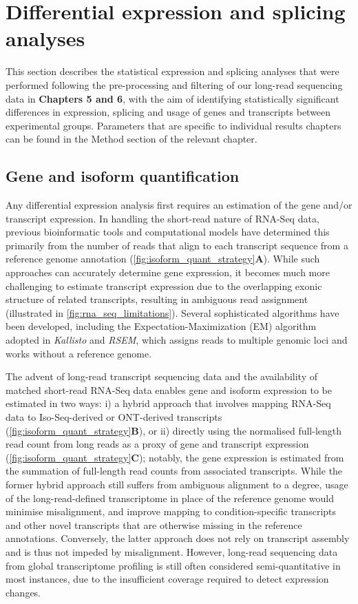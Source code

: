 \section{Differential expression and splicing analyses}

This section describes the statistical expression and splicing analyses that were performed following the pre-processing and filtering of our long-read sequencing data in \textbf{Chapters 5 and 6}, with the aim of identifying statistically significant differences in expression, splicing and usage of genes and transcripts between experimental groups. Parameters that are specific to individual results chapters can be found in the Method section of the relevant chapter. 

\subsection{Gene and isoform quantification}\label{sec: gene_isoform_quant_explained}
Any differential expression analysis first requires an estimation of the gene and/or transcript expression. In handling the short-read nature of RNA-Seq data, previous bioinformatic tools and computational models have determined this primarily from the number of reads that align to each transcript sequence from a reference genome annotation\cite{Conesa2016} (\cref{fig:isoform_quant_strategy}\textbf{A}). While such approaches can accurately determine gene expression, it becomes much more challenging to estimate transcript expression due to the overlapping exonic structure of related transcripts, resulting in ambiguous read assignment (illustrated in \cref{fig:rna_seq_limitations}). Several sophisticated algorithms have been developed, including the Expectation-Maximization (EM) algorithm adopted in \textit{Kallisto}\cite{Bray2016} and \textit{RSEM}\cite{Li2011}, which assigns reads to multiple genomic loci and works without a reference genome\cite{Conesa2016}. 

The advent of long-read transcript sequencing data and the availability of matched short-read RNA-Seq data enables gene and isoform expression to be estimated in two ways: i) a hybrid approach that involves mapping RNA-Seq data to Iso-Seq-derived or ONT-derived transcripts (\cref{fig:isoform_quant_strategy}\textbf{B}), or ii) directly using the normalised full-length read count from long reads as a proxy of gene and transcript expression (\cref{fig:isoform_quant_strategy}\textbf{C}); notably, the gene expression is estimated from the summation of full-length read counts from associated transcripts. While the former hybrid approach still suffers from ambiguous alignment to a degree, usage of the long-read-defined transcriptome in place of the reference genome would minimise misalignment, and improve mapping to condition-specific transcripts and other novel transcripts that are otherwise missing in the reference annotations\cite{Au2013}. Conversely, the latter approach does not rely on transcript assembly and is thus not impeded by misalignment. However, long-read sequencing data from global transcriptome profiling is still often considered semi-quantitative in most instances, due to the insufficient coverage required to detect expression changes.

